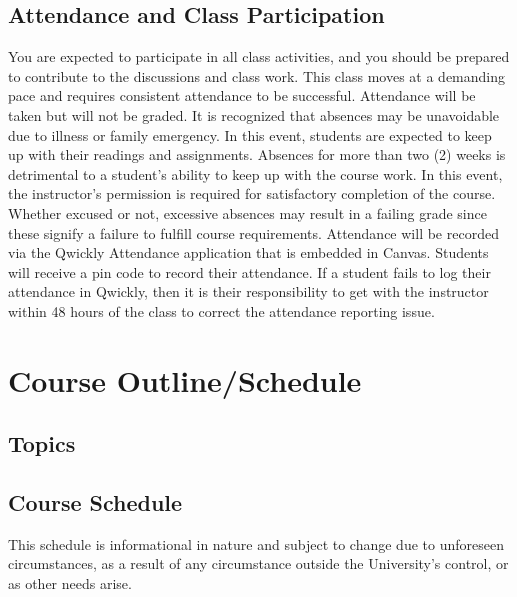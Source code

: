 \documentclass[11pt,]{article}
\begin{document}
\hypertarget{attendance-and-class-participation}{%
\subsection{Attendance and Class
Participation}\label{attendance-and-class-participation}}

You are expected to participate in all class activities, and you should
be prepared to contribute to the discussions and class work. This class
moves at a demanding pace and requires consistent attendance to be
successful. Attendance will be taken but will not be graded. It is
recognized that absences may be unavoidable due to illness or family
emergency. In this event, students are expected to keep up with their
readings and assignments. Absences for more than two (2) weeks is
detrimental to a student's ability to keep up with the course work. In
this event, the instructor's permission is required for satisfactory
completion of the course. Whether excused or not, excessive absences may
result in a failing grade since these signify a failure to fulfill
course requirements. Attendance will be recorded via the Qwickly
Attendance application that is embedded in Canvas. Students will receive
a pin code to record their attendance. If a student fails to log their
attendance in Qwickly, then it is their responsibility to get with the
instructor within 48 hours of the class to correct the attendance
reporting issue.

\hypertarget{course-outlineschedule}{%
\section{Course Outline/Schedule}\label{course-outlineschedule}}

\hypertarget{topics}{%
\subsection{Topics}\label{topics}}

\hypertarget{course-schedule}{%
\subsection{Course Schedule}\label{course-schedule}}

This schedule is informational in nature and subject to change due to
unforeseen circumstances, as a result of any circumstance outside the
University's control, or as other needs arise.
\end{document}
